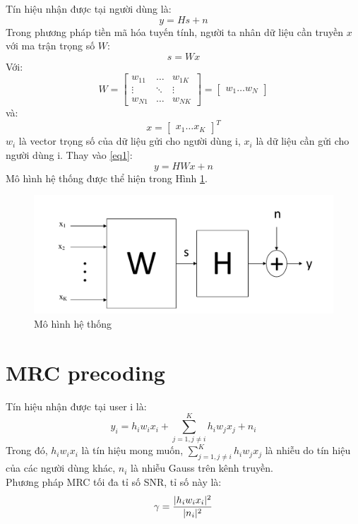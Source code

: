 \documentclass[conference]{IEEEtran}
\DeclarePairedDelimiter\abst{\lvert}{\rvert^2}
\begin{document}
	Tín hiệu nhận được tại người dùng là:
	\begin{equation}
	\label{eq1}
	y = Hs +n
	\end{equation}
	Trong phương pháp tiền mã hóa tuyến tính, người ta nhân dữ liệu cần truyền $x$ với ma trận trọng số $W$: 	
	\begin{equation*}	
	s = Wx
	\end{equation*} 
	Với:
	\[
	W = 
	\begin{bmatrix}
	w_{11} & \dots & w_{1K}\\
	\vdots & \ddots & \vdots\\
	w_{N1} & \dots & w_{NK}
	\end{bmatrix}
	=
	\begin{bmatrix}
	w_1 \dots w_N
	\end{bmatrix} 
	\]
	và:
	\[
	x = \begin{bmatrix}
	x_1 \dots x_K
	\end{bmatrix}^T
	\]
	$w_{i}$ là vector trọng số của dữ liệu gửi cho người dùng i, $x_i$ là dữ liệu cần gửi cho người dùng i.		
	Thay vào \eqref{eq1}:
	\begin{equation}
	y = HWx + n
	\end{equation}
	Mô hình hệ thống được thể hiện trong Hình \ref{SystemModel}.
	\begin{figure}[h]
		\includegraphics[width=\linewidth]{Figures/SystemModel.pdf}
		\caption{Mô hình hệ thống}
		\label{SystemModel}
	\end{figure}
	\section{MRC precoding}
	Tín hiệu nhận được tại user i là:
	\begin{equation*}
	y_i = h_iw_ix_i + \sum_{j = 1, j \ne i}^{K}{h_iw_jx_j} + n_i
	\end{equation*}
	Trong đó, $h_iw_ix_i$ là tín hiệu mong muốn, $\sum_{j = 1, j \ne i}^{K}{h_iw_jx_j}$ là nhiễu do tín hiệu của các người dùng khác, $n_i$ là nhiễu Gauss trên kênh truyền.\\
	Phương pháp MRC tối đa tỉ số SNR, tỉ số này là:
	\begin{equation*}
	\gamma = \frac{\abst{h_iw_ix_i}}{\abst{n_i}}
	\end{equation*}
	 
\end{document}
